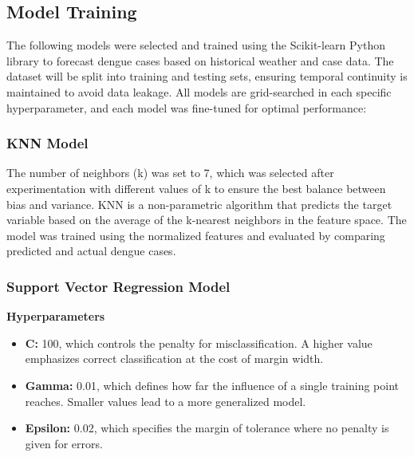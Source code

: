 \documentclass[runningheads]{llncs}
\begin{document}
\subsection{Model Training}
The following models were selected and trained using the Scikit-learn Python library to forecast dengue cases based on historical weather and case data. The dataset will be split into training and testing sets, ensuring temporal continuity is maintained to avoid data leakage. All models are grid-searched in each specific hyperparameter, and each model was fine-tuned for optimal performance:

\subsubsection{KNN Model}
The number of neighbors (k) was set to 7, which was selected after experimentation with different values of k to ensure the best balance between bias and variance. KNN is a non-parametric algorithm that predicts the target variable based on the average of the k-nearest neighbors in the feature space. The model was trained using the normalized features and evaluated by comparing predicted and actual dengue cases.

\subsubsection{Support Vector Regression Model}
\textbf{Hyperparameters}
\begin{itemize}
    \item \textbf{C:} 100, which controls the penalty for misclassification. A higher value emphasizes correct classification at the cost of margin width.
    \item \textbf{Gamma:} 0.01, which defines how far the influence of a single training point reaches. Smaller values lead to a more generalized model.
    \item \textbf{Epsilon:} 0.02, which specifies the margin of tolerance where no penalty is given for errors.
\end{itemize}
\end{document}
